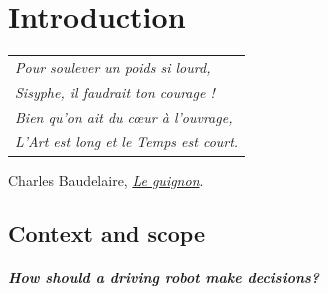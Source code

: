 
\graphicspath{{2-Chapters/1-Chapter/}}

\chapter{Introduction}
\label{chapter:1}

\begin{flushright}
	\begin{tabular}{@{}l@{}}
		\emph{Pour soulever un poids si lourd,}\\
		\emph{Sisyphe, il faudrait ton courage !}\\
		\emph{Bien qu’on ait du cœur à l’ouvrage,}\\
		\emph{L’Art est long et le Temps est court.}\\
	\end{tabular}

	Charles Baudelaire, \href{https://eleurent.github.io/sisyphe/texts/le-guignon.html}{\emph{Le guignon}}.
\end{flushright}

\section{Context and scope}


\paragraph{How should a driving robot make decisions?}


